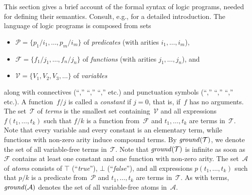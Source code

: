 This section gives a brief account of the formal syntax of logic programs,
needed for defining their semantics.
Consult, e.g., \cite{lloyd87a} for a detailed introduction.
The language of logic programs is composed from sets
%
\begin{itemize}
\item $\mathcal{P}=\{p_1/i_1,\dots,p_m/i_m\}$ of \emph{predicates}
      (with arities $i_1,\dots,i_m$),
\item $\mathcal{F}=\{f_1/j_1,\dots,f_n/j_n\}$ of \emph{functions}
      (with arities $j_1,\dots,j_n$), and
\item $\mathcal{V}=\{V_1,V_2,V_3,\dots\}$ of \emph{variables}
\end{itemize}
along with connectives (``\code{:-},'' ``\code{,},'' ``,'' etc.) and
punctuation symbols (``\code{(},'' ``\code{)},'' ``,'' etc.).
A function~$f/j$ is called a \emph{constant} if $j=0$, that is,
if~$f$ has no arguments.
The set~$\mathcal{T}$ of \emph{terms} is the smallest set containing~$\mathcal{V}$
and all expressions $f(t_1,\dots,t_k)$ such that $f/k$ is a function 
from~$\mathcal{F}$ and $t_1,\dots,t_k$ are terms in~$\mathcal{T}$.
Note that every variable and every constant is an elementary term,
while functions with non-zero arity induce compound terms.
By $\mathit{ground}(\mathcal{T})$, we denote the set of all variable-free
terms in~$\mathcal{T}$.
Note that $\mathit{ground}(\mathcal{T})$ is infinite
as soon as~$\mathcal{F}$ contains at least one constant and one function
with non-zero arity.
The set~$\mathcal{A}$ of \emph{atoms} consists of 
$\top$ (``\textit{true}''), $\bot$ (``\textit{false}''), and all expressions
$p(t_1,\dots,t_k)$ such that $p/k$ is a predicate
from~$\mathcal{P}$ and $t_1,\dots,t_k$ are terms in~$\mathcal{T}$.
As with terms, $\mathit{ground}(\mathcal{A})$ denotes the set of all variable-free
atoms in~$\mathcal{A}$.


